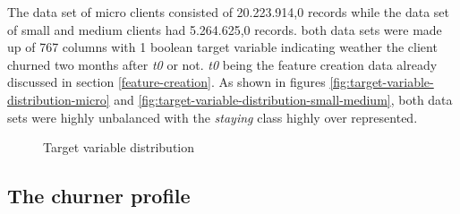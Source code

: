 \documentclass[LaM,binding=0.6cm, english]{sapthesis}
\begin{document}
The data set of micro clients consisted of 20.223.914,0 records while the data set of small and medium clients had 5.264.625,0 records. both data sets were made up of 767 columns with 1 boolean target variable indicating weather the client churned two months after \textit{t0} or not. \textit{t0} being the feature creation data already discussed in section \ref{feature-creation}. As shown in figures \ref{fig:target-variable-distribution-micro} and \ref{fig:target-variable-distribution-small-medium}, both data sets were highly unbalanced with the \textit{staying} class highly over represented.

\begin{figure}[!ht]
  \centering
  \hfill
  \caption{Target variable distribution}
\end{figure}

\subsection{The churner profile}
\end{document}

